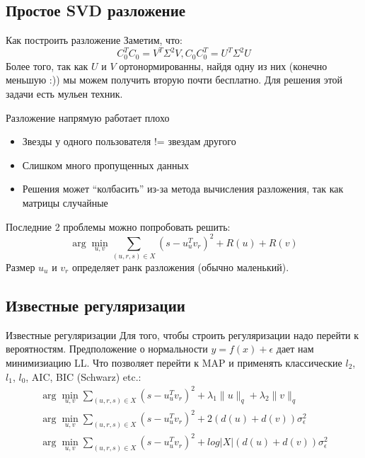 \documentclass[14pt, fleqn, xcolor={dvipsnames, table}]{beamer}
\begin{document}
\subsection{Простое SVD разложение}  %
\begin{frame}{Как построить разложение}
Заметим, что:
$$
C_0^T C_0 = V^T \Sigma^2 V, C_0 C_0^T = U^T \Sigma^2 U
$$
Более того, так как $U$ и $V$ ортонормированны, найдя одну из них (конечно меньшую :)) мы можем получить вторую почти бесплатно. Для решения этой задачи есть мульен техник.
\end{frame}

\begin{frame}{Разложение напрямую работает плохо}
\begin{itemize}
  \item Звезды у одного пользователя != звездам другого
  \item Слишком много пропущенных данных
  \item Решения может ``колбасить'' из-за метода вычисления разложения, так как матрицы случайные
\end{itemize}
Последние 2 проблемы можно попробовать решить:
$$
\arg \min_{u,v} \sum_{(u,r,s) \in X} (s - u_u^T v_r)^2 + R(u) + R(v)
$$
Размер $u_u$ и $v_r$ определяет ранк разложения (обычно маленький).
\end{frame}

\subsection{Известные регуляризации} %
\begin{frame}{Известные регуляризации}
\small
Для того, чтобы строить регуляризации надо перейти к вероятностям. Предположение о нормальности $y = f(x) + \epsilon$ дает нам минимизиацию LL. Что позволяет перейти к MAP и применять классические $l_2$, $l_1$, $l_0$, AIC, BIC (Schwarz) etc.:
$$\begin{array}{c}
\arg \min_{u,v} \sum_{(u,r,s) \in X} (s - u_u^T v_r)^2 + \lambda_1 \|u\|_q + \lambda_2 \|v\|_q \\
\arg \min_{u,v} \sum_{(u,r,s) \in X} (s - u_u^T v_r)^2 + 2 \left(d(u) + d(v)\right) \sigma^2_\epsilon \\
\arg \min_{u,v} \sum_{(u,r,s) \in X} (s - u_u^T v_r)^2 + log |X| \left(d(u) + d(v)\right) \sigma^2_\epsilon\\
\end{array}$$
\end{frame}
\end{document}
